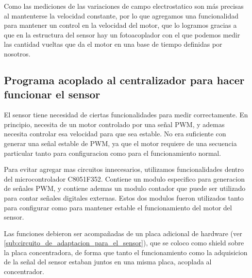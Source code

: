 \documentclass[a4paper]{article}
\begin{document}
Como las mediciones de las variaciones de campo electrostatico son más precisas al mantenterse la velocidad constante, por lo que agregamos una funcionalidad para mantener un control en la velocidad del motor, que lo logramos gracias a que en la estructura del sensor hay un fotoacoplador con el que podemos medir las cantidad vueltas que da el motor en una base de tiempo definidas por nosotros.



\subsection{Programa acoplado al centralizador para hacer funcionar el sensor} %
\label{sub:programa_acoplado_al_centralizador_para_hacer_funcionar_el_sensor}

El sensor tiene necesidad de ciertas funcionalidades para medir correctamente. En principio, necesita de un motor controlado por una señal PWM, y ademas necesita controlar esa velocidad para que sea estable. No era suficiente con generar una señal estable de PWM, ya que el motor requiere de una secuencia particular tanto para configuracion como para el funcionamiento normal.

Para evitar agregar mas circuitos innecesarios, utilizamos funcionalidades dentro del microcontrolador C8051F352. Contiene un modulo especifico para generacion de señales PWM, y contiene ademas un modulo contador que puede ser utilizado para contar señales digitales externas. Estos dos modulos fueron utilizados tanto para configurar como para mantener estable el funcionamiento del motor del sensor. 

Las funciones debieron ser acompañadas de un placa adicional de hardware (ver \ref{sub:circuito_de_adaptacion_para_el_sensor}), que se coloco como shield sobre la placa concentradora, de forma que tanto el funcionamiento como la adquisicion de la señal del sensor estaban juntos en una misma placa, acoplada al concentrador. 

\end{document}
